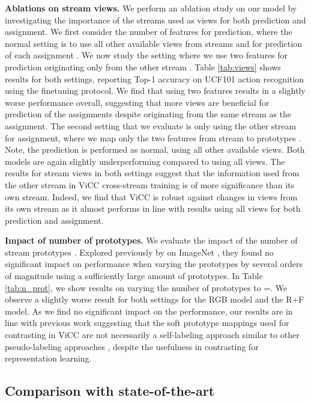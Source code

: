 \documentclass[10pt,twocolumn,letterpaper]{article}
\begin{document}
\textbf{Ablations on stream views.} We perform an ablation study on our model by investigating the importance of the streams used as views for both prediction and assignment. We first consider the number of features for prediction, where the normal setting is to use all other available views from streams  and  for prediction of each assignment . We now study the setting where we use two features for prediction originating only from the other stream . Table \ref{tab:views} shows results for both settings, reporting Top-1 accuracy on UCF101 action recognition using the finetuning protocol. We find that using two features results in a slightly worse performance overall, suggesting that more views are beneficial for prediction of the assignments despite originating from the same stream as the assignment. The second setting that we evaluate is only using the other stream  for assignment, where we map only the two features from stream  to prototypes . Note, the prediction is performed as normal, using all other available views. Both models are again slightly underperforming compared to using all views. The results for stream views in both settings suggest that the information used from the other stream in ViCC cross-stream training is of more significance than its own stream. Indeed, we find that ViCC is robust against changes in views from its own stream as it almost performs in line with results using all views for both prediction and assignment. 

\textbf{Impact of number of prototypes.} We evaluate the impact of the number of stream prototypes . Explored previously by \cite{caron_unsupervised_2020} on ImageNet \cite{deng_imagenet_2009}, they found no significant impact on performance when varying the prototypes by several orders of magnitude using a sufficiently large amount of prototypes. In Table \ref{tab:n_prot}, we show results on varying the number of prototypes to =. We observe a slightly worse result for both settings for the RGB model and the R+F model. As we find no significant impact on the performance, our results are in line with previous work suggesting that the soft prototype mappings used for contrasting in ViCC are not necessarily a self-labeling approach similar to other pseudo-labeling approaches \cite{asano_self-labelling_2020, asano_labelling_2020, gavrilyuk_motion-augmented_2021, caron_deep_2018, yan_clusterfit_2020}, despite the usefulness in contrasting for representation learning.

\subsection{Comparison with state-of-the-art}
\label{sec:compsota}
\end{document}
